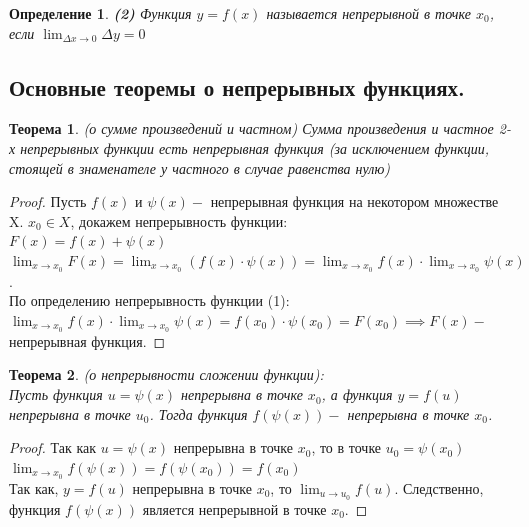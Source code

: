 \documentclass[12pt, a4paper]{article}
\newtheorem{theorem}{Теорема}[subsection]
\newtheorem{definition}{Определение}[subsection]
\theoremstyle{remark}
\begin{document}
	\begin{definition}
		\textbf{(2)} Функция $y = f(x)$ называется непрерывной в точке $x_0$, если $\lim_{\Delta x \to 0} \Delta y = 0$
	\end{definition}
	
	\subsection{Основные теоремы о непрерывных функциях.}
	
	\begin{theorem}
		(о сумме произведений и частном) Сумма произведения и частное 2-х непрерывных функции есть непрерывная функция (за исключением функции, стоящей в знаменателе у частного в случае равенства нулю)
	\end{theorem}
	
	\begin{proof}
		Пусть $f(x)$ и $\psi(x) -$ непрерывная функция на некотором множестве X. $x_0 \in X$, докажем непрерывность функции: \\
		
		$F(x) = f(x) + \psi(x)$ \\
		
		$\lim_{x \to x_0} F(x) = \lim_{x \to x_0}(f(x) \cdot \psi(x)) = \lim_{x \to x_0} f(x) \cdot \lim_{x \to x_0} \psi(x)$. \\
		
		По определению непрерывность функции (1): \\
		
		$\lim_{x \to x_0} f(x) \cdot \lim_{x \to x_0} \psi(x) = f(x_0) \cdot \psi(x_0) = F(x_0) \implies F(x) -$ непрерывная функция.
	\end{proof}
	
	\begin{theorem}
		(о непрерывности сложении функции): \\
		
		Пусть функция $u = \psi(x)$ непрерывна в точке $x_0$, а функция $y = f(u)$ непрерывна в точке $u_0$. Тогда функция $f(\psi(x)) -$ непрерывна в точке $x_0$. 
	\end{theorem}
	
	\newpage
	
	\begin{proof}
		Так как $u = \psi(x)$ непрерывна в точке $x_0$, то в точке $u_0 = \psi(x_0)$ \\
		
		$\lim_{x \to x_0} f(\psi(x)) = f(\psi(x_0)) = f(x_0)$ \\
		
		Так как, $y = f(u)$ непрерывна в точке $x_0$, то $\lim_{u \to u_0} f(u)$. Следственно, функция $f(\psi(x))$ является непрерывной в точке $x_0$.
	\end{proof}
	
\end{document}
